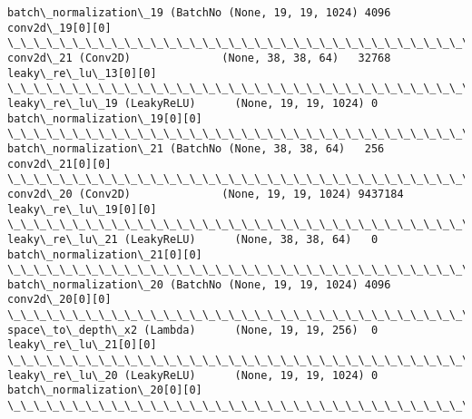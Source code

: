 \documentclass[11pt]{article}
\begin{document}
\begin{Verbatim}[commandchars=\\\{\}]
batch\_normalization\_19 (BatchNo (None, 19, 19, 1024) 4096        conv2d\_19[0][0]                  
\_\_\_\_\_\_\_\_\_\_\_\_\_\_\_\_\_\_\_\_\_\_\_\_\_\_\_\_\_\_\_\_\_\_\_\_\_\_\_\_\_\_\_\_\_\_\_\_\_\_\_\_\_\_\_\_\_\_\_\_\_\_\_\_\_\_\_\_\_\_\_\_\_\_\_\_\_\_\_\_\_\_\_\_\_\_\_\_\_\_\_\_\_\_\_\_\_\_
conv2d\_21 (Conv2D)              (None, 38, 38, 64)   32768       leaky\_re\_lu\_13[0][0]             
\_\_\_\_\_\_\_\_\_\_\_\_\_\_\_\_\_\_\_\_\_\_\_\_\_\_\_\_\_\_\_\_\_\_\_\_\_\_\_\_\_\_\_\_\_\_\_\_\_\_\_\_\_\_\_\_\_\_\_\_\_\_\_\_\_\_\_\_\_\_\_\_\_\_\_\_\_\_\_\_\_\_\_\_\_\_\_\_\_\_\_\_\_\_\_\_\_\_
leaky\_re\_lu\_19 (LeakyReLU)      (None, 19, 19, 1024) 0           batch\_normalization\_19[0][0]     
\_\_\_\_\_\_\_\_\_\_\_\_\_\_\_\_\_\_\_\_\_\_\_\_\_\_\_\_\_\_\_\_\_\_\_\_\_\_\_\_\_\_\_\_\_\_\_\_\_\_\_\_\_\_\_\_\_\_\_\_\_\_\_\_\_\_\_\_\_\_\_\_\_\_\_\_\_\_\_\_\_\_\_\_\_\_\_\_\_\_\_\_\_\_\_\_\_\_
batch\_normalization\_21 (BatchNo (None, 38, 38, 64)   256         conv2d\_21[0][0]                  
\_\_\_\_\_\_\_\_\_\_\_\_\_\_\_\_\_\_\_\_\_\_\_\_\_\_\_\_\_\_\_\_\_\_\_\_\_\_\_\_\_\_\_\_\_\_\_\_\_\_\_\_\_\_\_\_\_\_\_\_\_\_\_\_\_\_\_\_\_\_\_\_\_\_\_\_\_\_\_\_\_\_\_\_\_\_\_\_\_\_\_\_\_\_\_\_\_\_
conv2d\_20 (Conv2D)              (None, 19, 19, 1024) 9437184     leaky\_re\_lu\_19[0][0]             
\_\_\_\_\_\_\_\_\_\_\_\_\_\_\_\_\_\_\_\_\_\_\_\_\_\_\_\_\_\_\_\_\_\_\_\_\_\_\_\_\_\_\_\_\_\_\_\_\_\_\_\_\_\_\_\_\_\_\_\_\_\_\_\_\_\_\_\_\_\_\_\_\_\_\_\_\_\_\_\_\_\_\_\_\_\_\_\_\_\_\_\_\_\_\_\_\_\_
leaky\_re\_lu\_21 (LeakyReLU)      (None, 38, 38, 64)   0           batch\_normalization\_21[0][0]     
\_\_\_\_\_\_\_\_\_\_\_\_\_\_\_\_\_\_\_\_\_\_\_\_\_\_\_\_\_\_\_\_\_\_\_\_\_\_\_\_\_\_\_\_\_\_\_\_\_\_\_\_\_\_\_\_\_\_\_\_\_\_\_\_\_\_\_\_\_\_\_\_\_\_\_\_\_\_\_\_\_\_\_\_\_\_\_\_\_\_\_\_\_\_\_\_\_\_
batch\_normalization\_20 (BatchNo (None, 19, 19, 1024) 4096        conv2d\_20[0][0]                  
\_\_\_\_\_\_\_\_\_\_\_\_\_\_\_\_\_\_\_\_\_\_\_\_\_\_\_\_\_\_\_\_\_\_\_\_\_\_\_\_\_\_\_\_\_\_\_\_\_\_\_\_\_\_\_\_\_\_\_\_\_\_\_\_\_\_\_\_\_\_\_\_\_\_\_\_\_\_\_\_\_\_\_\_\_\_\_\_\_\_\_\_\_\_\_\_\_\_
space\_to\_depth\_x2 (Lambda)      (None, 19, 19, 256)  0           leaky\_re\_lu\_21[0][0]             
\_\_\_\_\_\_\_\_\_\_\_\_\_\_\_\_\_\_\_\_\_\_\_\_\_\_\_\_\_\_\_\_\_\_\_\_\_\_\_\_\_\_\_\_\_\_\_\_\_\_\_\_\_\_\_\_\_\_\_\_\_\_\_\_\_\_\_\_\_\_\_\_\_\_\_\_\_\_\_\_\_\_\_\_\_\_\_\_\_\_\_\_\_\_\_\_\_\_
leaky\_re\_lu\_20 (LeakyReLU)      (None, 19, 19, 1024) 0           batch\_normalization\_20[0][0]     
\_\_\_\_\_\_\_\_\_\_\_\_\_\_\_\_\_\_\_\_\_\_\_\_\_\_\_\_\_\_\_\_\_\_\_\_\_\_\_\_\_\_\_\_\_\_\_\_\_\_\_\_\_\_\_\_\_\_\_\_\_\_\_\_\_\_\_\_\_\_\_\_\_\_\_\_\_\_\_\_\_\_\_\_\_\_\_\_\_\_\_\_\_\_\_\_\_\_

\end{Verbatim}
\end{document}
